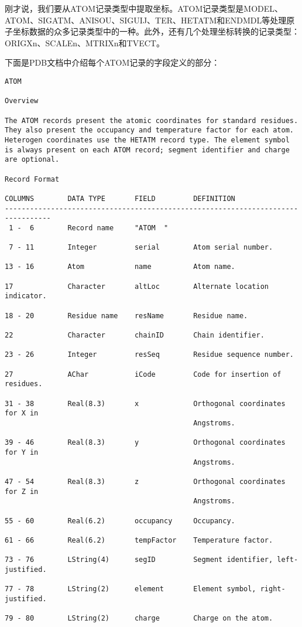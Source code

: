 刚才说，我们要从ATOM记录类型中提取坐标。ATOM记录类型是MODEL、ATOM、SIGATM、ANISOU、SIGUIJ、TER、HETATM和ENDMDL等处理原子坐标数据的众多记录类型中的一种。此外，还有几个处理坐标转换的记录类型：ORIGXn、SCALEn、MTRIXn和TVECT。

下面是PDB文档中介绍每个ATOM记录的字段定义的部分：

\begin{lstlisting}
ATOM 

Overview 

The ATOM records present the atomic coordinates for standard residues.
They also present the occupancy and temperature factor for each atom.
Heterogen coordinates use the HETATM record type. The element symbol
is always present on each ATOM record; segment identifier and charge
are optional. 

Record Format 

COLUMNS        DATA TYPE       FIELD         DEFINITION                            
---------------------------------------------------------------------------------
 1 -  6        Record name     "ATOM  "                                            

 7 - 11        Integer         serial        Atom serial number.                   

13 - 16        Atom            name          Atom name.                            

17             Character       altLoc        Alternate location indicator.         

18 - 20        Residue name    resName       Residue name.                         

22             Character       chainID       Chain identifier.                     

23 - 26        Integer         resSeq        Residue sequence number.              

27             AChar           iCode         Code for insertion of residues.       

31 - 38        Real(8.3)       x             Orthogonal coordinates for X in       
                                             Angstroms.                       

39 - 46        Real(8.3)       y             Orthogonal coordinates for Y in       
                                             Angstroms.                            

47 - 54        Real(8.3)       z             Orthogonal coordinates for Z in       
                                             Angstroms.                            

55 - 60        Real(6.2)       occupancy     Occupancy.                            

61 - 66        Real(6.2)       tempFactor    Temperature factor.                   

73 - 76        LString(4)      segID         Segment identifier, left-justified.   

77 - 78        LString(2)      element       Element symbol, right-justified.      

79 - 80        LString(2)      charge        Charge on the atom.       
\end{lstlisting}

